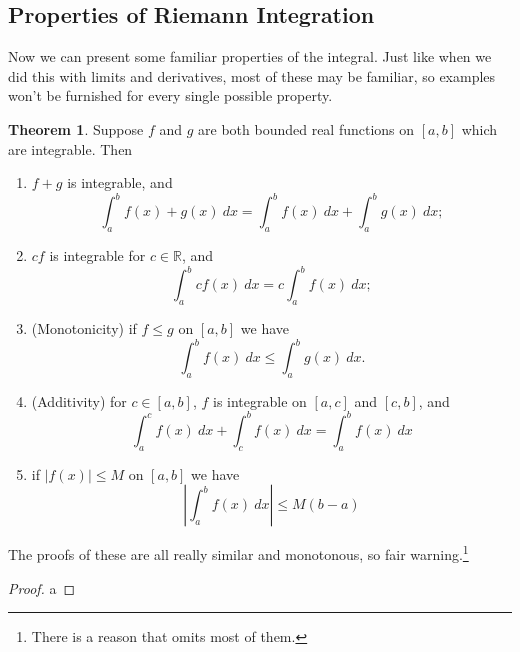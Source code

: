 \documentclass{article}
\newcommand{\R}{\mathbb{R}}
\theoremstyle{definition}
\newtheorem{theorem}{Theorem}[section]
\begin{document}
	\subsection{Properties of Riemann Integration}
	Now we can present some familiar properties of the integral. Just like when we did this with limits and derivatives, most of these may be familiar, so examples won't be furnished for every single possible property. 
	\begin{theorem}
		Suppose $ f $ and $ g $ are both bounded real functions on $ [a,b] $ which are integrable. Then 
		\begin{enumerate}
			\item $ f+g $ is integrable, and $$ \int_{a}^{b}f(x)+g(x)\ dx=\int_{a}^{b}f(x)\ dx+\int_{a}^{b}g(x)\ dx;$$
			\item $ cf $ is integrable for $ c\in\R $, and $$\int_{a}^{b}cf(x)\ dx=c\int_{a}^{b}f(x)\ dx; $$
			\item (Monotonicity) if $ f\le g $ on $ [a,b] $ we have $$\int_{a}^{b}f(x)\ dx\le \int_{a}^{b}g(x)\ dx.$$
			\item (Additivity) for $ c\in[a,b] $, $ f $ is integrable on $ [a,c] $ and $ [c,b] $, and $$\int_{a}^{c}f(x)\ dx+\int_{c}^{b}f(x)\ dx=\int_{a}^{b}f(x)\ dx $$
			\item if $ |f(x)|\le M $ on $ [a,b] $ we have $$ \left\lvert\int_{a}^{b}f(x)\ dx \right\rvert\le M(b-a)$$
		\end{enumerate}
		The proofs of these are all really similar and monotonous, so fair warning.\footnote{There is a reason that \cite{rudin1964principles} omits most of them.}
		\begin{proof}{\color{white}a}
			

\end{proof}
\end{theorem}
\end{document}
